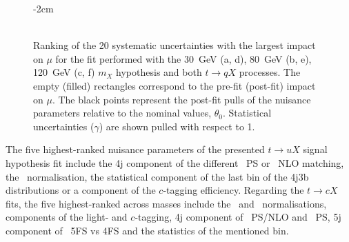 \begin{figure}[htb]
    \RawFloats
    \addtolength{\leftskip} {-2cm} %
    \addtolength{\rightskip}{-2cm}
    \centering
    \\
    \\
    \caption{Ranking of the 20 systematic uncertainties with the largest impact on $\mu$ for the fit performed with the 30~GeV (a, d), 80~GeV (b, e), 120~GeV (c, f) $m_X$ hypothesis and both $t\to qX$ processes. The empty (filled) rectangles correspond  to the pre-fit (post-fit) impact on $\mu$. The black points represent the post-fit pulls of the nuisance parameters relative to the nominal values, $\theta_0$. Statistical uncertainties ($\gamma$) are shown pulled with respect to 1.
    }
    \label{tqX:ranking3080120}
\end{figure}

The five highest-ranked nuisance parameters of the presented $t\to uX$ signal hypothesis fit include the 4j component of the different \ttjets\ PS or \ttl\ NLO matching, the \ttc\ normalisation, the statistical component of the last bin of the 4j3b distributions or a component of the $c$-tagging efficiency. Regarding the $t\to cX$ fits, the five highest-ranked across masses include the \ttb\ and \ttc\ normalisations, components of the light- and $c$-tagging, 4j component of \ttb\ PS/NLO and \ttl\ PS, 5j component of \ttb\ 5FS vs 4FS and the statistics of the mentioned bin.\\

